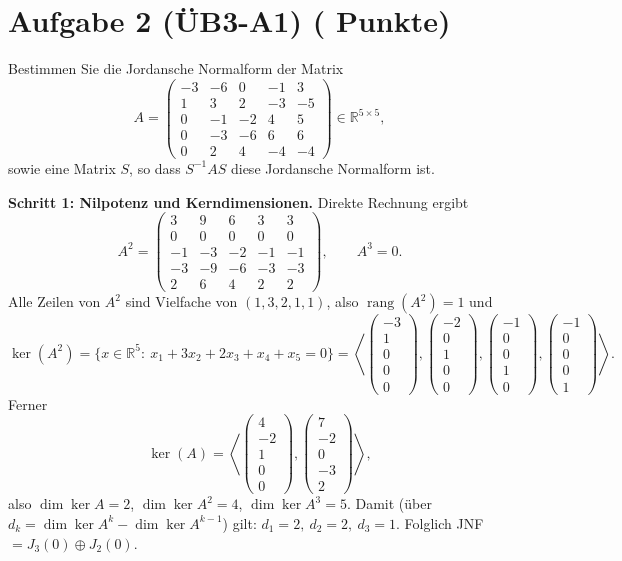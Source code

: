 \documentclass[11pt, a4paper]{article}
\newcommand{\aufgabe}[2]{%
  \section*{\Large\bfseries Aufgabe #1%
  \if\relax\detokenize{#2}\relax\else \hfill\normalfont\normalsize(#2 Punkte)\fi}%
  \vspace{-1.5ex}
}
\begin{document}
\aufgabe{2 (ÜB3-A1)}{}
Bestimmen Sie die Jordansche Normalform der Matrix
\[
A=
\begin{pmatrix}
-3 & -6 & 0 & -1 & 3\\
 1 &  3 & 2 & -3 & -5\\
 0 & -1 & -2 &  4 & 5\\
 0 & -3 & -6 &  6 & 6\\
 0 &  2 & 4 & -4 & -4
\end{pmatrix}\in\mathbb{R}^{5\times 5},
\]
sowie eine Matrix $S$, so dass $S^{-1}AS$ diese Jordansche Normalform ist.
\begin{framed}
\textbf{Schritt 1: Nilpotenz und Kerndimensionen.}
Direkte Rechnung ergibt
\[
A^2=
\begin{pmatrix}
3 & 9 & 6 & 3 & 3\\
0 & 0 & 0 & 0 & 0\\
-1 & -3 & -2 & -1 & -1\\
-3 & -9 & -6 & -3 & -3\\
2 & 6 & 4 & 2 & 2
\end{pmatrix},
\qquad
A^3=0 .
\]
Alle Zeilen von \(A^2\) sind Vielfache von \((1,3,2,1,1)\), also \(\operatorname{rang}(A^2)=1\) und
\[
\ker(A^2)=\{x\in\mathbb R^5:\ x_1+3x_2+2x_3+x_4+x_5=0\}
=\left\langle
\begin{pmatrix}-3\\1\\0\\0\\0\end{pmatrix},
\begin{pmatrix}-2\\0\\1\\0\\0\end{pmatrix},
\begin{pmatrix}-1\\0\\0\\1\\0\end{pmatrix},
\begin{pmatrix}-1\\0\\0\\0\\1\end{pmatrix}
\right\rangle.
\]
Ferner
\[
\ker(A)=\left\langle
\begin{pmatrix}4\\-2\\1\\0\\0\end{pmatrix},
\begin{pmatrix}7\\-2\\0\\-3\\2\end{pmatrix}
\right\rangle,
\]
also \(\dim\ker A=2\), \(\dim\ker A^2=4\), \(\dim\ker A^3=5\).
Damit (über \(d_k=\dim\ker A^k-\dim\ker A^{k-1}\)) gilt:
\(d_1=2,\ d_2=2,\ d_3=1\).
Folglich JNF \(=J_3(0)\oplus J_2(0)\).


\end{framed}
\end{document}
